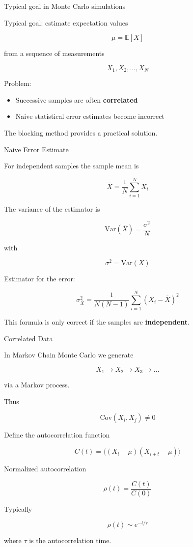 \documentclass{beamer}
\begin{document}
\begin{frame}{Typical goal in Monte Carlo simulations}

Typical goal: estimate expectation values

\[
\mu = \mathbb{E}[X]
\]

from a sequence of measurements

\[
X_1, X_2, \dots, X_N
\]

Problem:

\begin{itemize}
\item Successive samples are often \textbf{correlated}
\item Naive statistical error estimates become incorrect
\end{itemize}

The blocking method provides a practical solution.
\end{frame}


\begin{frame}{Naive Error Estimate}

For independent samples the sample mean is

\[
\bar X = \frac{1}{N}\sum_{i=1}^{N} X_i
\]

The variance of the estimator is

\[
\mathrm{Var}(\bar X)
=
\frac{\sigma^2}{N}
\]

with

\[
\sigma^2 = \mathrm{Var}(X)
\]

Estimator for the error:

\[
\sigma_{\bar X}^2
=
\frac{1}{N(N-1)}
\sum_{i=1}^N (X_i-\bar X)^2
\]

This formula is only correct if the samples are \textbf{independent}.
\end{frame}




\begin{frame}{Correlated Data}

  In Markov Chain Monte Carlo we generate

  \[
  X_1 \rightarrow X_2 \rightarrow X_3 \rightarrow \dots
  \]

  via a Markov process.

  Thus

  \[
  \text{Cov}(X_i,X_j) \neq 0
  \]

  Define the autocorrelation function

  \[
  C(t)
  =
  \langle (X_i-\mu)(X_{i+t}-\mu) \rangle
  \]

  Normalized autocorrelation

  \[
  \rho(t) = \frac{C(t)}{C(0)}
  \]

  Typically

  \[
  \rho(t) \sim e^{-t/\tau}
  \]

  where $\tau$ is the autocorrelation time.
\end{frame}
\end{document}
